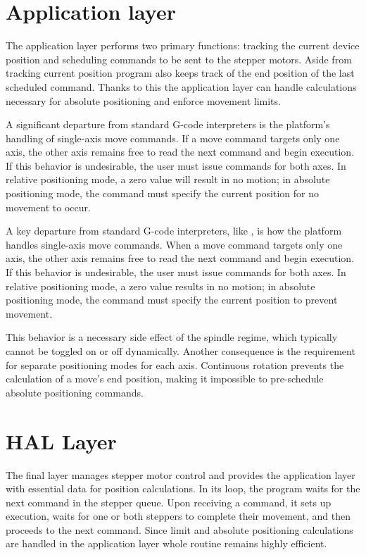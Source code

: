 \section{Application layer}

The application layer performs two primary functions: tracking the current device position and scheduling commands to be sent to the stepper motors.
Aside from tracking current position program also keeps track of the end position of the last scheduled command.
Thanks to this the application layer can handle calculations necessary for absolute positioning and enforce movement limits.

A significant departure from standard G-code interpreters is the platform's handling of single-axis move commands.
If a move command targets only one axis, the other axis remains free to read the next command and begin execution.
If this behavior is undesirable, the user must issue commands for both axes.
In relative positioning mode, a zero value will result in no motion; in absolute positioning mode, the command must specify the current position for no movement to occur.

A key departure from standard G-code interpreters, like \cite{duet}, is how the platform handles single-axis move commands.
When a move command targets only one axis, the other axis remains free to read the next command and begin execution.
If this behavior is undesirable, the user must issue commands for both axes.
In relative positioning mode, a zero value results in no motion; in absolute positioning mode, the command must specify the current position to prevent movement.

This behavior is a necessary side effect of the spindle regime, which typically cannot be toggled on or off dynamically.
Another consequence is the requirement for separate positioning modes for each axis.
Continuous rotation prevents the calculation of a move’s end position, making it impossible to pre-schedule absolute positioning commands.




\section{HAL Layer}

The final layer manages stepper motor control and provides the application layer with essential data for position calculations.
In its loop, the program waits for the next command in the stepper queue.
Upon receiving a command, it sets up execution, waits for one or both steppers to complete their movement, and then proceeds to the next command.
Since limit and absolute positioning calculations are handled in the application layer whole routine remains highly efficient.

